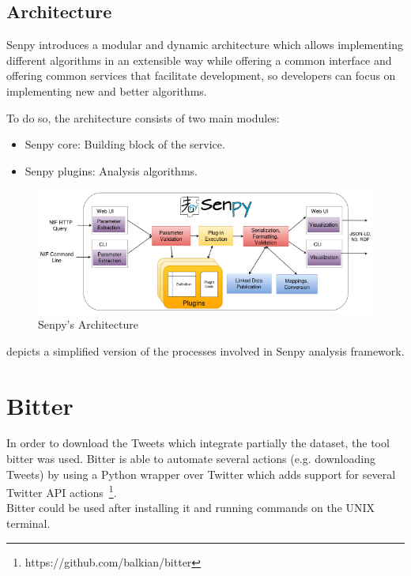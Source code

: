 \subsection{Architecture}
Senpy introduces a modular and dynamic architecture which allows implementing different algorithms in an extensible way while offering a common interface and offering common services that facilitate development, so developers can focus on implementing new and better algorithms.\par
To do so, the architecture consists of two main modules:
\begin{itemize}
	\item Senpy core: Building block of the service.
	\item Senpy plugins: Analysis algorithms.
\end{itemize}
\begin{figure}
	\hspace{-2.1cm}
	\includegraphics[scale=0.85]{img/senpy_architecture.png}
	\caption{Senpy's Architecture~\cite{senpy}}
	\label{fig:senpyarch}
\end{figure}
 depicts a simplified version of the processes involved in Senpy analysis framework.

\section{Bitter}
\label{sec:bitter}
In order to download the Tweets which integrate partially the dataset, the tool bitter was used. Bitter is able to automate several actions (e.g. downloading Tweets) by using a Python wrapper over Twitter which adds support for several Twitter API actions~\footnote{https://github.com/balkian/bitter}.\\
Bitter could be used after installing it and running commands on the UNIX terminal.
